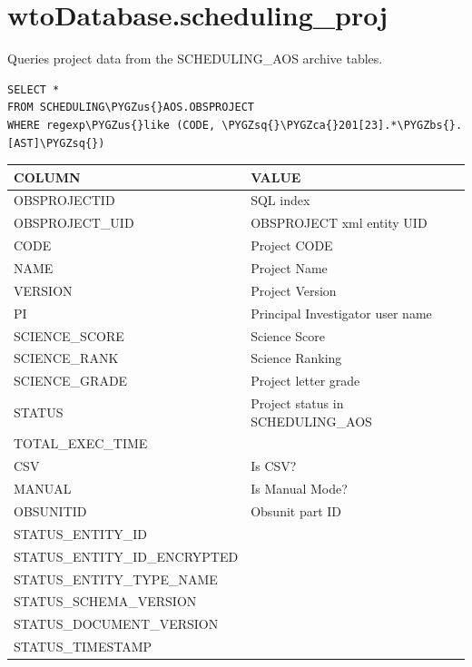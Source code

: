 \documentclass[a4paper,10pt,english]{sphinxmanual}
\def\PYGZbs{\char`\\}
\def\PYGZus{\char`\_}
\def\PYGZca{\char`\^}
\def\PYGZsq{\char`\'}
\begin{document}
\section{wtoDatabase.scheduling\_proj}
\label{wtodata:wtodatabase-scheduling-proj}
Queries project data from the SCHEDULING\_AOS archive tables.

\begin{Verbatim}[commandchars=\\\{\}]
SELECT *
FROM SCHEDULING\PYGZus{}AOS.OBSPROJECT
WHERE regexp\PYGZus{}like (CODE, \PYGZsq{}\PYGZca{}201[23].*\PYGZbs{}.[AST]\PYGZsq{})
\end{Verbatim}

\begin{tabulary}{\linewidth}{|L|L|}
\hline
\textsf{\relax 
COLUMN
} & \textsf{\relax 
VALUE
}\\
\hline
OBSPROJECTID
 & 
SQL index
\\

OBSPROJECT\_UID
 & 
OBSPROJECT xml entity UID
\\

CODE
 & 
Project CODE
\\

NAME
 & 
Project Name
\\

VERSION
 & 
Project Version
\\

PI
 & 
Principal Investigator user name
\\

SCIENCE\_SCORE
 & 
Science Score
\\

SCIENCE\_RANK
 & 
Science Ranking
\\

SCIENCE\_GRADE
 & 
Project letter grade
\\

STATUS
 & 
Project status in SCHEDULING\_AOS
\\

TOTAL\_EXEC\_TIME
 & \\

CSV
 & 
Is CSV?
\\

MANUAL
 & 
Is Manual Mode?
\\

OBSUNITID
 & 
Obsunit part ID
\\

STATUS\_ENTITY\_ID
 & \\

STATUS\_ENTITY\_ID\_ENCRYPTED
 & \\

STATUS\_ENTITY\_TYPE\_NAME
 & \\

STATUS\_SCHEMA\_VERSION
 & \\

STATUS\_DOCUMENT\_VERSION
 & \\

STATUS\_TIMESTAMP
 & \\
\hline\end{tabulary}
\end{document}
